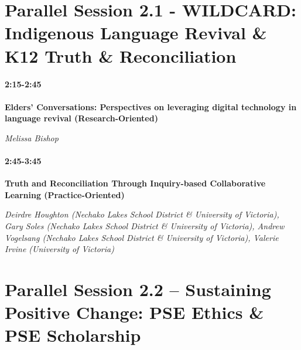 \documentclass[
]{book}
\begin{document}
\hypertarget{parallel-session-2.1---wildcard-indigenous-language-revival-k12-truth-reconciliation}{%
\section*{Parallel Session 2.1 - WILDCARD: Indigenous Language Revival \& K12 Truth \& Reconciliation}\label{parallel-session-2.1---wildcard-indigenous-language-revival-k12-truth-reconciliation}}

\begin{secondary}
\hypertarget{section}{%
\paragraph{2:15-2:45}\label{section}}

\textbf{Elders' Conversations: Perspectives on leveraging digital
technology in language revival (Research-Oriented)}

\emph{Melissa Bishop}
\end{secondary}

\begin{secondary}
\hypertarget{section}{%
\paragraph*{2:45-3:45}\label{section}}

\textbf{Truth and Reconciliation Through Inquiry-based Collaborative
Learning (Practice-Oriented)}

\emph{Deirdre Houghton (Nechako Lakes School District \& University of
Victoria), Gary Soles (Nechako Lakes School District \& University of
Victoria), Andrew Vogelsang (Nechako Lakes School District \& University
of Victoria), Valerie Irvine (University of Victoria)}
\end{secondary}

\hypertarget{parallel-session-2.2-sustaining-positive-change-pse-ethics-pse-scholarship}{%
\section*{Parallel Session 2.2 -- Sustaining Positive Change: PSE Ethics \& PSE Scholarship}\label{parallel-session-2.2-sustaining-positive-change-pse-ethics-pse-scholarship}}
\end{document}
